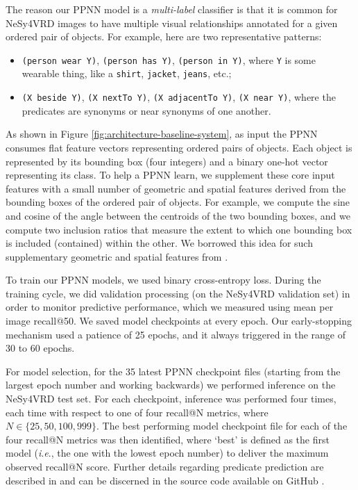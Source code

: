 \documentclass[]{jair}
\newcommand{\ie}{\textit{i}.\textit{e}.,\xspace}
\begin{document}
The reason our PPNN model is a \emph{multi-label} classifier is that it is common for NeSy4VRD images to have multiple visual relationships annotated for a given ordered pair of objects.
For example, here are two representative patterns:
\begin{itemize}
    \item \texttt{(person wear Y)}, \texttt{(person has Y)}, \texttt{(person in Y)}, where \texttt{Y} is some wearable thing, like a \texttt{shirt}, \texttt{jacket}, \texttt{jeans}, etc.;
    \item \texttt{(X beside Y)}, \texttt{(X nextTo Y)}, \texttt{(X adjacentTo Y)}, \texttt{(X near Y)}, where the predicates are synonyms or near synonyms of one another.
\end{itemize}

As shown in Figure \ref{fig:architecture-baseline-system}, as input the PPNN consumes flat feature vectors representing ordered pairs of objects.
Each object is represented by its bounding box (four integers) and a binary one-hot vector representing its class.
To help a PPNN learn, we supplement these core input features with a small number of geometric and spatial features derived from the bounding boxes of the ordered pair of objects.
For example, we compute the sine and cosine of the angle between the centroids of the two bounding boxes, and we compute two inclusion ratios that measure the extent to which one bounding box is included (contained) within the other.
We borrowed this idea for such supplementary geometric and spatial features from \citet{DBLP:conf/ijcnn/DonadelloS19}.

To train our PPNN models, we used binary cross-entropy loss.
During the training cycle, we did validation processing (on the NeSy4VRD validation set) in order to monitor predictive performance, which we measured using mean per image recall@50.
We saved model checkpoints at every epoch.
Our early-stopping mechanism used a patience of 25 epochs, and it always triggered in the range of 30 to 60 epochs.

For model selection, for the 35 latest PPNN checkpoint files (starting from the largest epoch number and working backwards) we performed inference on the NeSy4VRD test set.
For each checkpoint, inference was performed four times, each time with respect to one of four recall@N metrics, where $N \in \{25,50,100,999\}$.
The best performing model checkpoint file for each of the four recall@N metrics was then identified, where `best' is defined as the first model (\ie the one with the lowest epoch number) to deliver the maximum observed recall@N score.
Further details regarding predicate prediction are described in \citet{HerronThesis2025} and can be discerned in the source code available on GitHub \citet{KGR4VRD_github}.
\end{document}
